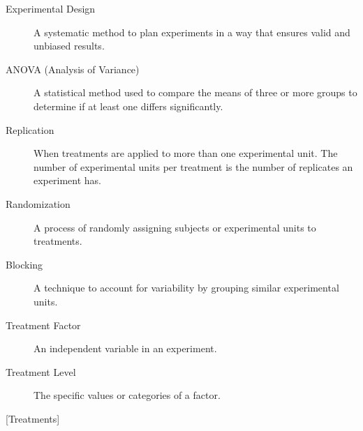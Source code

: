 \documentclass[
  letterpaper,
]{book}
\begin{document}
\begin{description}
\item[\label{glossary-experimental-design}{Experimental
Design}]
A systematic method to plan experiments in a way that ensures valid and
unbiased results.
\item[\label{glossary-anova-analysis-of-variance}{ANOVA
(Analysis of Variance)}]
A statistical method used to compare the means of three or more groups
to determine if at least one differs significantly.
\item[\label{glossary-replication}{Replication}]
When treatments are applied to more than one experimental unit. The
number of experimental units per treatment is the number of replicates
an experiment has.
\item[\label{glossary-randomization}{Randomization}]
A process of randomly assigning subjects or experimental units to
treatments.
\item[\label{glossary-blocking}{Blocking}]
A technique to account for variability by grouping similar experimental
units.
\item[\label{glossary-factor}{Treatment Factor}]
An independent variable in an experiment.
\item[\label{glossary-level}{Treatment Level}]
The specific values or categories of a factor.
\end{description}

{[}Treatments{]}
\end{document}
